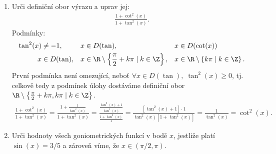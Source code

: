 \documentclass[11pt,a4paper]{article}
\begin{document}
\begin{enumerate}
            \item Urči definiční obor výrazu a uprav jej:
            \begin{align*}
                \frac{1+\cot^2(x)}{1+\tan^2(x)}.
            \end{align*}
            Podmínky:\begin{align*}
                \tan^2(x) &\neq -1,
            &
                x &\in D(\tan),
            &
                x &\in D(\cot(x))
            \\
                x &\in D(\tan),
            &
                x &\in \R \setminus \left\{ \frac \pi 2 + k\pi \mid k \in \Z \right\},
            &
                x &\in \R \setminus \left\{ k\pi \mid k \in \Z \right\}.
            \end{align*}
            První podmínka není omezující, neboť $\forall x \in D(\tan), \; \tan^2(x) \geq 0$, tj. celkově tedy z podmínek úlohy dostáváme definiční obor $\R \setminus \left\{ \frac \pi 2 + k\pi, k\pi \mid k \in \Z \right\}$.
            \begin{align*}
                \frac{1+\cot^2(x)}{1+\tan^2(x)} = \frac{1 + \frac{1}{\tan^2(x)}}{1+\tan^2(x)} = \frac{\frac{\tan^2(x) + 1}{\tan^2(x)}}{\frac{1+\tan^2(x)}{1}} = \frac{[\tan^2(x)+1]\cdot 1}{\tan^2(x) [1+\tan^2(x)]} = \frac{1}{\tan^2(x)} = \cot^2(x).
            \end{align*}

            \item Urči hodnoty všech goniometrických funkcí v bodě $x$, jestliže platí $\sin(x) = 3/5$ a zároveň víme, že $x \in (\pi/2,\pi)$.
            

\end{enumerate}
\end{document}

